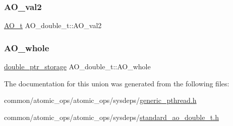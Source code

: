 \subsubsection{\texorpdfstring{A\+O\+\_\+val2}{AO\_val2}}
{\footnotesize\ttfamily \hyperlink{atomic__ops_8h_a5225fef4d9eee821e82382cd269160dd}{A\+O\+\_\+t} A\+O\+\_\+double\+\_\+t\+::\+A\+O\+\_\+val2}

\mbox{\label{structAO__double__t_a029ebe26b957e9b920c286705b24022a}} 
\subsubsection{\texorpdfstring{A\+O\+\_\+whole}{AO\_whole}}
{\footnotesize\ttfamily \hyperlink{standard__ao__double__t_8h_ac63c23baae3d771141f4660fbd1fbf7e}{double\+\_\+ptr\+\_\+storage} A\+O\+\_\+double\+\_\+t\+::\+A\+O\+\_\+whole}



The documentation for this union was generated from the following files\+:\begin{DoxyCompactItemize}
\item 
common/atomic\+\_\+ops/atomic\+\_\+ops/sysdeps/\hyperlink{generic__pthread_8h}{generic\+\_\+pthread.\+h}\item 
common/atomic\+\_\+ops/atomic\+\_\+ops/sysdeps/\hyperlink{standard__ao__double__t_8h}{standard\+\_\+ao\+\_\+double\+\_\+t.\+h}\end{DoxyCompactItemize}
